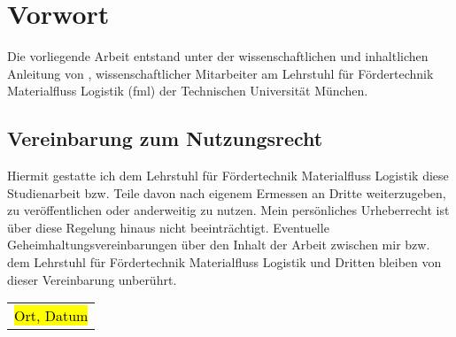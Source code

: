 \chapter*{Vorwort}
\thispagestyle{empty}
Die vorliegende Arbeit entstand unter der wissenschaftlichen und inhaltlichen Anleitung von \Betreuer, wissenschaftlicher Mitarbeiter am Lehrstuhl für Fördertechnik Materialfluss Logistik (fml) der Technischen Universität München. 

\vspace{2cm}
\section*{Vereinbarung zum Nutzungsrecht} 

Hiermit gestatte ich dem Lehrstuhl für Fördertechnik Materialfluss Logistik diese Studienarbeit bzw. Teile davon nach eigenem Ermessen an Dritte weiterzugeben, zu veröffentlichen oder anderweitig zu nutzen. Mein persönliches Urheberrecht ist über diese Regelung hinaus nicht beeinträchtigt. 
Eventuelle Geheimhaltungsvereinbarungen über den Inhalt der Arbeit zwischen mir bzw. dem Lehrstuhl für Fördertechnik Materialfluss Logistik und Dritten bleiben von dieser Vereinbarung unberührt. 

\vspace{2cm}
\begin{tabular}{@{}l@{}}\hline
	\hl{Ort, Datum} \hspace{1,5cm}
\end{tabular}
